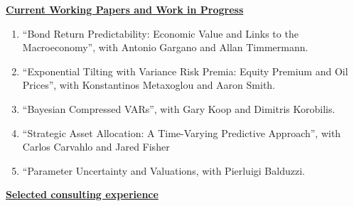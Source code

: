 \documentclass[12pt]{article}
\begin{document}
\underline{\textbf{Current Working Papers and Work in Progress}}
\begin{enumerate}
	\setcounter{enumi}{\theenumTemp}
	\item ``Bond Return Predictability: Economic Value and Links to the Macroeconomy'', with Antonio Gargano and Allan Timmermann.
	\item ``Exponential Tilting with Variance Risk Premia: Equity Premium and Oil Prices'', with Konstantinos Metaxoglou  and Aaron Smith.
	\item ``Bayesian Compressed VARs'', with Gary Koop and Dimitris Korobilis.
	\item ``Strategic Asset Allocation: A Time-Varying Predictive Approach'', with Carlos Carvahlo and Jared Fisher 
	\item ``Parameter Uncertainty and Valuations, with Pierluigi Balduzzi.
	
\end{enumerate}

\underline{\textbf{Selected consulting experience}}
	
\end{document}
